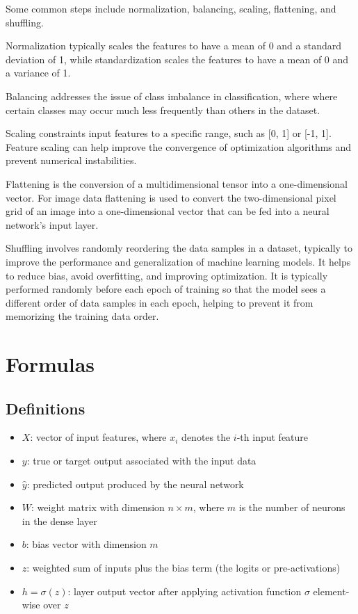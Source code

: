 \documentclass[a4paper]{report}
\begin{document}
\begin{description}
Some common steps include normalization, balancing, scaling, flattening, and shuffling.

Normalization typically scales the features to have a mean of 0 and a standard deviation of 1, while standardization scales the features to have a mean of 0 and a variance of 1.

Balancing addresses the issue of class imbalance in classification, where where certain classes may occur much less frequently than others in the dataset. 

Scaling constraints input features to a specific range, such as [0, 1] or [-1, 1]. Feature scaling can help improve the convergence of optimization algorithms and prevent numerical instabilities.

Flattening is the conversion of a multidimensional tensor into a one-dimensional vector. For image data flattening is used to convert the two-dimensional pixel grid of an image into a one-dimensional vector that can be fed into a neural network's input layer.

Shuffling involves randomly reordering the data samples in a dataset, typically to improve the performance and generalization of machine learning models. It helps to reduce bias, avoid overfitting, and improving optimization. It is typically performed randomly before each epoch of training so that the model sees a different order of data samples in each epoch, helping to prevent it from memorizing the training data order.
\end{description}



\chapter{Formulas}


\section{Definitions}

\begin{itemize}
\item $X$: vector of input features, where $x_i$ denotes the $i$-th input feature
\item $y$: true or target output associated with the input data
\item $\hat{y}$: predicted output produced by the neural network
\item $W$: weight matrix with dimension $n \times m$, where $m$ is the number of neurons in the dense layer
\item $b$: bias vector with dimension $m$
\item $z$: weighted sum of inputs plus the bias term (the logits or pre-activations)
\item $h=\sigma(z)$: layer output vector after applying activation function $\sigma$ element-wise over $z$
\end{itemize}
\end{document}
